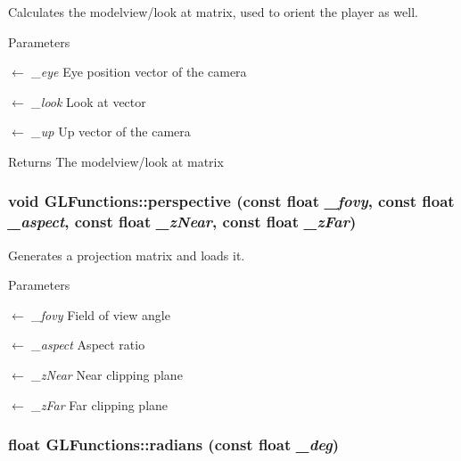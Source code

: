 Calculates the modelview/look at matrix, used to orient the player as well. 
\begin{DoxyParams}{Parameters}
\item[\mbox{$\leftarrow$} {\em \_\-eye}]Eye position vector of the camera \item[\mbox{$\leftarrow$} {\em \_\-look}]Look at vector \item[\mbox{$\leftarrow$} {\em \_\-up}]Up vector of the camera \end{DoxyParams}
\begin{DoxyReturn}{Returns}
The modelview/look at matrix 
\end{DoxyReturn}
\hypertarget{classGLFunctions_a85268eb7e53538a0e00da8e8f66ca3d1}{
\subsubsection[{perspective}]{\setlength{\rightskip}{0pt plus 5cm}void GLFunctions::perspective (const float {\em \_\-fovy}, \/  const float {\em \_\-aspect}, \/  const float {\em \_\-zNear}, \/  const float {\em \_\-zFar})}}
\label{classGLFunctions_a85268eb7e53538a0e00da8e8f66ca3d1}


Generates a projection matrix and loads it. 
\begin{DoxyParams}{Parameters}
\item[\mbox{$\leftarrow$} {\em \_\-fovy}]Field of view angle \item[\mbox{$\leftarrow$} {\em \_\-aspect}]Aspect ratio \item[\mbox{$\leftarrow$} {\em \_\-zNear}]Near clipping plane \item[\mbox{$\leftarrow$} {\em \_\-zFar}]Far clipping plane \end{DoxyParams}
\hypertarget{classGLFunctions_a408bdb911a650c5517d7fca5b2e29ac1}{
\subsubsection[{radians}]{\setlength{\rightskip}{0pt plus 5cm}float GLFunctions::radians (const float {\em \_\-deg})}}
\label{classGLFunctions_a408bdb911a650c5517d7fca5b2e29ac1}



